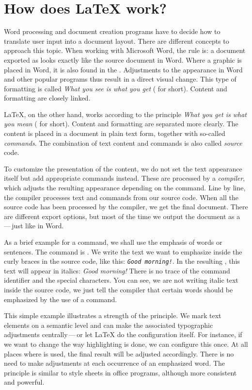 \chapter{How does \LaTeX{} work?}
\label{sec:basic-functionality}

Word processing and document creation programs have to decide how to translate user input into a document layout.
There are different concepts to approach this topic.
When working with Microsoft Word, the rule is: a document exported as  looks exactly like the source document in Word. 
Where a graphic is placed in Word, it is also found in the . 
Adjustments to the appearance in Word and other popular programs thus result in a direct visual change. 
This type of formatting is called \emph{What you see is what you get} ( for short). 
Content and formatting are closely linked.

\LaTeX{}, on the other hand, works according to the principle \emph{What you get is what you mean} ( for short). 
Content and formatting are separated more clearly.
The content is placed in a document in plain text form, together with so-called \emph{commands}. 
The combination of text content and commands is also called \emph{source} code.

To customize the presentation of the content, we do not set the text appearance itself but add appropriate commands instead. 
These are processed by a \emph{compiler}, which adjusts the resulting appearance depending on the command. 
Line by line, the compiler processes text and commands from our source code. 
When all the source code has been processed by the compiler, we get the final document. 
There are different export options, but most of the time we output the document as a \,---\,just like in Word.

As a brief example for a command, we shall use the emphasis of words or sentences. 
The command is \texttt{\emph{}}. 
We write the text we want to emphasize inside the curly braces in the source code, like this: 
\texttt{\emph{Good morning!}}. 
In the resulting , this text will appear in italics: \emph{Good morning!} 
There is no trace of the command identifier and the special characters. 
You can see, we are not writing italic text inside the source code, we just tell the compiler that certain words should be emphasized by the use of a command.

This simple example illustrates a strength of the  principle. 
We mark text elements on a semantic level and can make the associated typographic adjustments centrally\,---\,or let \LaTeX{} do the configuration itself.
For instance, if we want to change the way highlighting is done, we can configure this once. 
At all places where \texttt{\emph{}} is used, the final result will be adjusted accordingly. 
There is no need to make adjustments at each occurrence of an emphasized word. 
The principle is similar to style sheets in office programs, although more consistent and powerful.

